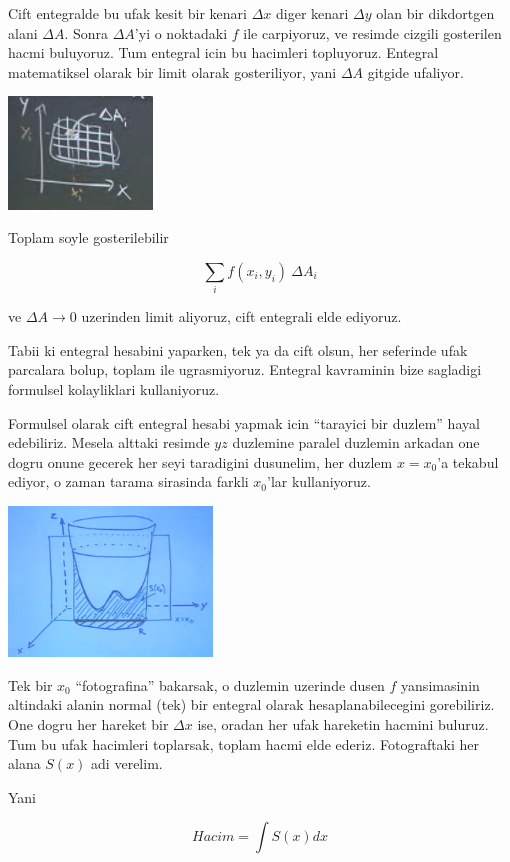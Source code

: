 \documentclass[12pt,fleqn]{article}
\begin{document}
Cift entegralde bu ufak kesit bir kenari $\Delta x$ diger kenari $\Delta y$ olan
bir dikdortgen alani $\Delta A$. Sonra $\Delta A$'yi o noktadaki $f$ ile
carpiyoruz, ve resimde cizgili gosterilen hacmi buluyoruz. Tum entegral icin
bu hacimleri topluyoruz. Entegral matematiksel olarak bir limit olarak
gosteriliyor, yani $\Delta A$ gitgide ufaliyor. 

\includegraphics[height=3cm]{16_4.png}

Toplam soyle gosterilebilir

\[ \sum_i f(x_i,y_i) \ \Delta A_i \]

ve $\Delta A \to 0$ uzerinden limit aliyoruz, cift entegrali elde ediyoruz. 

Tabii ki entegral hesabini yaparken, tek ya da cift olsun, her seferinde
ufak parcalara bolup, toplam ile ugrasmiyoruz. Entegral kavraminin bize
sagladigi formulsel kolayliklari kullaniyoruz.

Formulsel olarak cift entegral hesabi yapmak icin ``tarayici bir
duzlem'' hayal edebiliriz. Mesela alttaki resimde $yz$ duzlemine paralel
duzlemin arkadan one dogru onune gecerek her seyi taradigini dusunelim, her
duzlem $x=x_0$'a tekabul ediyor, o zaman tarama sirasinda farkli $x_0$'lar
kullaniyoruz.

\includegraphics[height=4cm]{16_5.png}

Tek bir $x_0$ ``fotografina'' bakarsak, o duzlemin uzerinde dusen $f$
yansimasinin altindaki alanin normal (tek) bir entegral olarak
hesaplanabilecegini gorebiliriz. One dogru her hareket bir $\Delta x$ ise,
oradan her ufak hareketin hacmini buluruz. Tum bu ufak hacimleri toplarsak,
toplam hacmi elde ederiz. Fotograftaki her alana $S(x)$ adi verelim.

Yani 

\[ Hacim = \int S(x) dx \]
\end{document}
